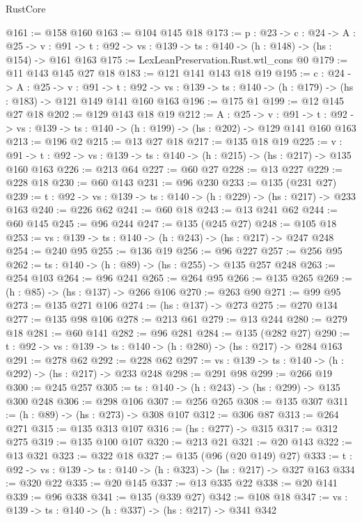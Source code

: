 \begin{lexlean}{RustCore}
\begin{coremodule}
@161 := @158 @160
@163 := @104 @145 @18
@173 := {p : @23} ->
  {c : @24} ->
  {A : @25} ->
  {v : @91} -> {t : @92} -> {vs : @139} -> {ts : @140} -> (h : @148) -> (hs : @154) -> @161 @163
@175 := LexLeanPreservation.Rust.wtl_cons @0
@179 := @11 @143 @145 @27 @18
@183 := @121 @141 @143 @18 @19
@195 := {c : @24} ->
  {A : @25} ->
  {v : @91} ->
  {t : @92} -> {vs : @139} -> {ts : @140} -> (h : @179) -> (hs : @183) -> @121 @149 @141 @160 @163
@196 := @175 @1
@199 := @12 @145 @27 @18
@202 := @129 @143 @18 @19
@212 := {A : @25} ->
  {v : @91} ->
  {t : @92} -> {vs : @139} -> {ts : @140} -> (h : @199) -> (hs : @202) -> @129 @141 @160 @163
@213 := @196 @2
@215 := @13 @27 @18
@217 := @135 @18 @19
@225 := {v : @91} ->
  {t : @92} -> {vs : @139} -> {ts : @140} -> (h : @215) -> (hs : @217) -> @135 @160 @163
@226 := @213 @64
@227 := @60 @27
@228 := @13 @227
@229 := @228 @18
@230 := @60 @143
@231 := @96 @230
@233 := @135 (@231 @27)
@239 := {t : @92} -> {vs : @139} -> {ts : @140} -> (h : @229) -> (hs : @217) -> @233 @163
@240 := @226 @62
@241 := @60 @18
@243 := @13 @241 @62
@244 := @60 @145
@245 := @96 @244
@247 := @135 (@245 @27)
@248 := @105 @18
@253 := {vs : @139} -> {ts : @140} -> (h : @243) -> (hs : @217) -> @247 @248
@254 := @240 @95
@255 := @136 @19
@256 := @96 @227
@257 := @256 @95
@262 := {ts : @140} -> (h : @89) -> (hs : @255) -> @135 @257 @248
@263 := @254 @103
@264 := @96 @241
@265 := @264 @95
@266 := @135 @265
@269 := (h : @85) -> (hs : @137) -> @266 @106
@270 := @263 @90
@271 := @99 @95
@273 := @135 @271 @106
@274 := (hs : @137) -> @273
@275 := @270 @134
@277 := @135 @98 @106
@278 := @213 @61
@279 := @13 @244
@280 := @279 @18
@281 := @60 @141
@282 := @96 @281
@284 := @135 (@282 @27)
@290 := {t : @92} -> {vs : @139} -> {ts : @140} -> (h : @280) -> (hs : @217) -> @284 @163
@291 := @278 @62
@292 := @228 @62
@297 := {vs : @139} -> {ts : @140} -> (h : @292) -> (hs : @217) -> @233 @248
@298 := @291 @98
@299 := @266 @19
@300 := @245 @257
@305 := {ts : @140} -> (h : @243) -> (hs : @299) -> @135 @300 @248
@306 := @298 @106
@307 := @256 @265
@308 := @135 @307
@311 := (h : @89) -> (hs : @273) -> @308 @107
@312 := @306 @87
@313 := @264 @271
@315 := @135 @313 @107
@316 := (hs : @277) -> @315
@317 := @312 @275
@319 := @135 @100 @107
@320 := @213 @21
@321 := @20 @143
@322 := @13 @321
@323 := @322 @18
@327 := @135 (@96 (@20 @149) @27)
@333 := {t : @92} -> {vs : @139} -> {ts : @140} -> (h : @323) -> (hs : @217) -> @327 @163
@334 := @320 @22
@335 := @20 @145
@337 := @13 @335 @22
@338 := @20 @141
@339 := @96 @338
@341 := @135 (@339 @27)
@342 := @108 @18
@347 := {vs : @139} -> {ts : @140} -> (h : @337) -> (hs : @217) -> @341 @342

\end{coremodule}
\end{lexlean}
